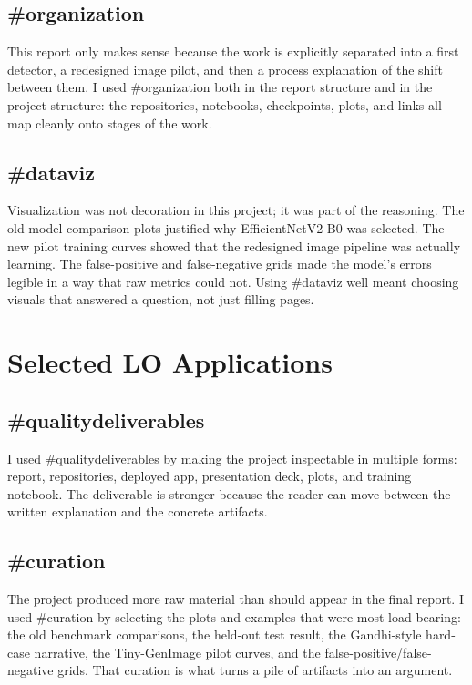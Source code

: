 \documentclass[11pt]{article}
\begin{document}
\subsection*{\#organization}
This report only makes sense because the work is explicitly separated into a first detector, a redesigned image pilot, and then a process explanation of the shift between them. I used \#organization both in the report structure and in the project structure: the repositories, notebooks, checkpoints, plots, and links all map cleanly onto stages of the work.

\subsection*{\#dataviz}
Visualization was not decoration in this project; it was part of the reasoning. The old model-comparison plots justified why EfficientNetV2-B0 was selected. The new pilot training curves showed that the redesigned image pipeline was actually learning. The false-positive and false-negative grids made the model's errors legible in a way that raw metrics could not. Using \#dataviz well meant choosing visuals that answered a question, not just filling pages.

\section{Selected LO Applications}

\subsection*{\#qualitydeliverables}
I used \#qualitydeliverables by making the project inspectable in multiple forms: report, repositories, deployed app, presentation deck, plots, and training notebook. The deliverable is stronger because the reader can move between the written explanation and the concrete artifacts.

\subsection*{\#curation}
The project produced more raw material than should appear in the final report. I used \#curation by selecting the plots and examples that were most load-bearing: the old benchmark comparisons, the held-out test result, the Gandhi-style hard-case narrative, the Tiny-GenImage pilot curves, and the false-positive/false-negative grids. That curation is what turns a pile of artifacts into an argument.
\end{document}

